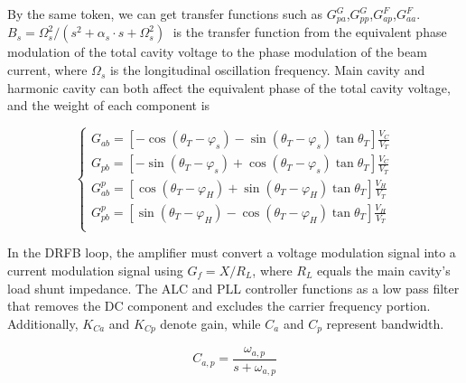 \documentclass[letterpaper,
               nospread,     %
               ]{jacow}
\begin{document}
By the same token, we can get transfer functions such as ${G_{pa}^{G}}$,${G_{pp}^{G}}$,${G_{ap}^{F}}$,${G_{aa}^{F}}$. ${{B}_{s}}={\Omega _{s}^{2}}/{\left( {{s}^{2}}+{{\alpha }_{s}}\cdot s+\Omega _{s}^{2} \right)}\;$ is the transfer function from the equivalent phase modulation of the total cavity voltage to the phase modulation of the beam current, where $\Omega _s^{}$  is the longitudinal oscillation frequency\cite{ref9}. Main cavity and harmonic cavity can both affect the equivalent phase of the total cavity voltage\cite{ref10}, and the weight of each component is
\begin{small}
   \begin{equation}\label{eq:label}
      \left\{ \begin{matrix}
         G_{ab}=[-\cos ({{\theta }_{T}}-{{\varphi }_{s}})-\sin ({{\theta }_{T}}-{{\varphi }_{s}})\tan {{\theta }_{T}}]\frac{{{V}_{C}}}{{{V}_{T}}}    \\
         G_{pb}=[-\sin ({{\theta }_{T}}-{{\varphi }_{s}})+\cos ({{\theta }_{T}}-{{\varphi }_{s}})\tan {{\theta }_{T}}]\frac{{{V}_{C}}}{{{V}_{T}}}    \\
         G_{ab}^{p}=[\cos ({{\theta }_{T}}-{{\varphi }_{H}})+\sin ({{\theta }_{T}}-{{\varphi }_{H}})\tan {{\theta }_{T}}]\frac{{{V}_{H}}}{{{V}_{T}}} \\
         G_{pb}^{p}=[\sin ({{\theta }_{T}}-{{\varphi }_{H}})-\cos ({{\theta }_{T}}-{{\varphi }_{H}})\tan {{\theta }_{T}}]\frac{{{V}_{H}}}{{{V}_{T}}} \\
      \end{matrix} \right.
   \end{equation}
\end{small}

In the DRFB loop, the amplifier must convert a voltage modulation signal into a current modulation signal using ${{G}_{f}}={X}/{{{R}_{L}}}$, where ${{R}_{L}}$ equals the main cavity's load shunt impedance. The ALC and PLL controller functions as a low pass filter that removes the DC component and excludes the carrier frequency portion\cite{ref11}. Additionally, ${{K}_{Ca}}$ and ${{K}_{Cp}}$ denote gain, while ${{C}_{a}}$ and ${{C}_{p}}$ represent bandwidth.

\begin{equation}\label{eq:label}
   {{C}_{a,p}}=\frac{{{\omega }_{a,p}}}{s+{{\omega }_{a,p}}}
\end{equation}
\end{document}
